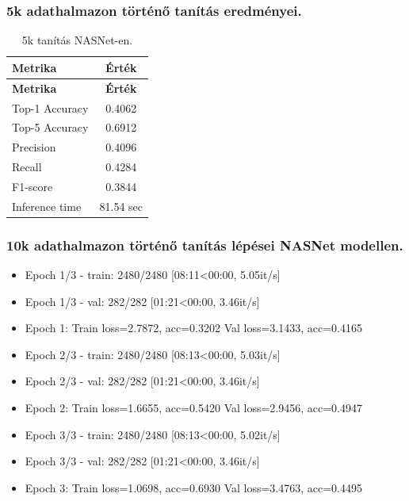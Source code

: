 \subsubsection{5k adathalmazon történő tanítás eredményei.}
  \begin{center}
    \begin{longtable}{l c}
    \caption{5k tanítás NASNet-en.} \label{tab:phase03_NASNet_5k} \\
    \toprule
    \textbf{Metrika} & \textbf{Érték} \\
    \midrule
    \endfirsthead
    \toprule
    \textbf{Metrika} & \textbf{Érték} \\
    \midrule
    \endhead
    Top-1 Accuracy & 0.4062 \\
    Top-5 Accuracy & 0.6912 \\
    Precision      & 0.4096 \\
    Recall         & 0.4284 \\
    F1-score       & 0.3844 \\
    Inference time & 81.54 sec \\
    \bottomrule
    \end{longtable}
  \end{center}

\subsubsection{10k adathalmazon történő tanítás lépései NASNet modellen.}
  \begin{itemize} 
    \item Epoch 1/3 - train: 2480/2480 [08:11<00:00, 5.05it/s]
    \item Epoch 1/3 - val: 282/282 [01:21<00:00, 3.46it/s]
    \item Epoch 1: Train loss=2.7872, acc=0.3202 Val loss=3.1433, acc=0.4165
    \item Epoch 2/3 - train: 2480/2480 [08:13<00:00, 5.03it/s]
    \item Epoch 2/3 - val: 282/282 [01:21<00:00, 3.46it/s]
    \item Epoch 2: Train loss=1.6655, acc=0.5420 Val loss=2.9456, acc=0.4947
    \item Epoch 3/3 - train: 2480/2480 [08:13<00:00, 5.02it/s]
    \item Epoch 3/3 - val: 282/282 [01:21<00:00, 3.46it/s]
    \item Epoch 3: Train loss=1.0698, acc=0.6930 Val loss=3.4763, acc=0.4495
  \end{itemize}

